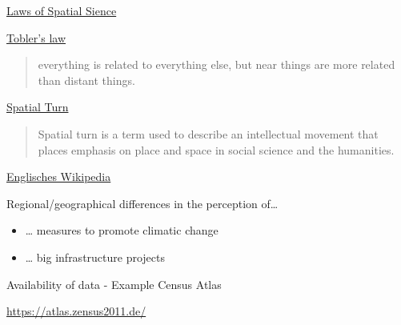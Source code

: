 \documentclass[ignorenonframetext,]{beamer}
\providecommand{\tightlist}{%
  \setlength{\itemsep}{0pt}\setlength{\parskip}{0pt}}
\begin{document}
\begin{frame}{\href{http://de.slideshare.net/rheimann04/big-social-data-the-spatial-turn-in-big-data}{Laws
of Spatial Sience}}

\href{https://en.wikipedia.org/wiki/Tobler's_first_law_of_geography}{Tobler's
law}

\begin{quote}
everything is related to everything else, but near things are more
related than distant things.
\end{quote}

\end{frame}

\begin{frame}{\href{https://de.wikipedia.org/wiki/Spatial_turn}{Spatial
Turn}}

\begin{quote}
Spatial turn is a term used to describe an intellectual movement that
places emphasis on place and space in social science and the humanities.
\end{quote}

\href{https://en.wikipedia.org/wiki/Spatial_turn}{Englisches Wikipedia}

\end{frame}

\begin{frame}{Regional/geographical differences in the perception
of\ldots{}}

\begin{itemize}
\tightlist
\item
  \ldots{} measures to promote climatic change
\item
  \ldots{} big infrastructure projects
\end{itemize}

\end{frame}

\begin{frame}{Availability of data - Example Census Atlas}

\url{https://atlas.zensus2011.de/}

\end{frame}
\end{document}
